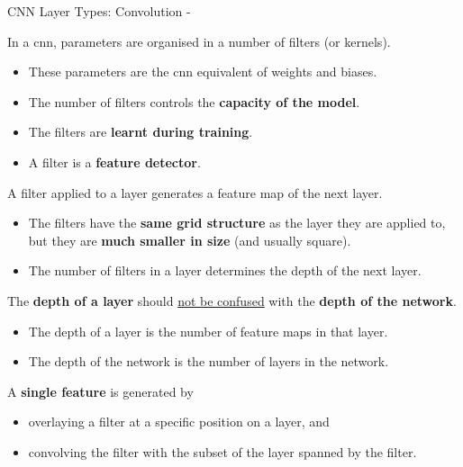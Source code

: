 
%
%
%

\begin{frame}[t,allowframebreaks]{CNN Layer Types: Convolution -}

    In a \gls{cnn},
    parameters are organised in a number of 
    \glspl{filter} (or \glspl{kernel}).
    \begin{itemize}
        \item
        These parameters are the \gls{cnn} equivalent of weights and biases.
        \item
        The number of \glspl{filter} controls the {\bf capacity of the model}.
        \item 
        The \glspl{filter} are {\bf learnt during training}.
        \item 
        A \gls{filter} is a {\bf feature detector}.
    \end{itemize}

    \vspace{0.2cm}

    A \gls{filter} applied to a layer generates 
    a \gls{feature map} of the next layer.
    \begin{itemize}
        \item
        The \glspl{filter} have the {\bf same grid structure} as the layer they are applied to,
        but they are {\bf much smaller in size} (and usually square).
        \item
        The number of filters in a layer determines the depth of the next layer.
    \end{itemize}

    \begin{blockexample}{}
        \small
        The {\bf depth of a layer} should \underline{not be confused} 
        with the {\bf depth of the network}.
        \begin{itemize}
          \item The depth of a layer is the number of feature maps in that layer.
          \item The depth of the network is the number of layers in the network.
        \end{itemize}
    \end{blockexample}

    \framebreak

    A {\bf single feature} is generated by 
    \begin{itemize}
      \item 
      overlaying a \gls{filter} at a specific position on a layer, and
      \item 
      convolving the filter with the subset of the layer spanned by the filter.
    \end{itemize}


\end{frame}
